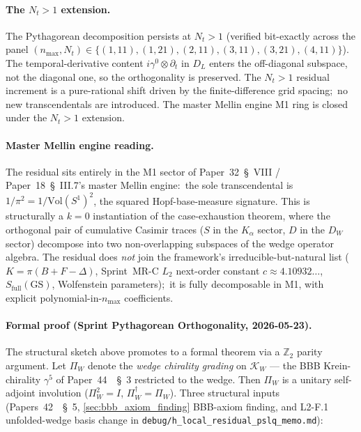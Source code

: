 \documentclass[11pt,a4paper]{article}
\theoremstyle{plain}
\theoremstyle{definition}
\newcommand{\nmax}{n_{\max}}
\newcommand{\Nt}{N_t}
\newcommand{\Vol}{\mathrm{Vol}}
\newcommand{\DL}{D_{L}}
\begin{document}
\paragraph{The $\Nt > 1$ extension.}
The Pythagorean decomposition persists at $\Nt > 1$ (verified
bit-exactly across the panel $(\nmax, N_t) \in
\{(1, 11), (1, 21), (2, 11), (3, 11), (3, 21), (4, 11)\}$). The
temporal-derivative content $i\gamma^0 \otimes \partial_t$ in
$\DL$ enters the off-diagonal subspace, not the diagonal one, so
the orthogonality is preserved. The $\Nt > 1$ residual increment
is a pure-rational shift driven by the finite-difference grid
spacing;\ no new transcendentals are introduced. The master
Mellin engine M1 ring is closed under the $\Nt > 1$ extension.

\paragraph{Master Mellin engine reading.}
The residual sits entirely in the M1 sector of
Paper~32~\S~VIII / Paper~18~\S~III.7's master Mellin engine:\ the
sole transcendental is $1/\pi^2 = 1/\Vol(S^1)^2$, the squared
Hopf-base-measure signature. This is structurally a $k = 0$
instantiation of the case-exhaustion theorem, where the orthogonal
pair of cumulative Casimir traces ($S$ in the $K_\alpha$ sector,
$D$ in the $D_W$ sector) decompose into two non-overlapping
subspaces of the wedge operator algebra. The residual does
\emph{not} join the framework's irreducible-but-natural list
($K = \pi(B + F - \Delta)$, Sprint~MR-C $L_2$ next-order
constant $c \approx 4.10932\ldots$, $S_{\mathrm{full}}(\mathrm{GS})$,
Wolfenstein parameters);\ it is fully decomposable in M1, with
explicit polynomial-in-$\nmax$ coefficients.

\paragraph{Formal proof (Sprint Pythagorean Orthogonality, 2026-05-23).}
The structural sketch above promotes to a formal theorem via a
$\mathbb{Z}_{2}$ parity argument. Let $\Pi_{W}$ denote the
\emph{wedge chirality grading} on $\mathcal{K}_{W}$ — the BBB
Krein-chirality $\gamma^{5}$ of Paper~44~\cite{paper44}~\S~3
restricted to the wedge. Then $\Pi_{W}$ is a unitary self-adjoint
involution ($\Pi_{W}^{2} = I$, $\Pi_{W}^{\dagger} = \Pi_{W}$).
Three structural inputs (Papers~42~\cite{paper42}~\S~5,
\ref{sec:bbb_axiom_finding} BBB-axiom finding, and L2-F.1
unfolded-wedge basis change in
\texttt{debug/h\_local\_residual\_pslq\_memo.md}):
\end{document}
